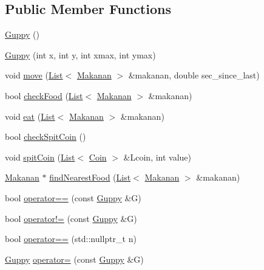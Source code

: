 \subsection*{Public Member Functions}
\begin{DoxyCompactItemize}
\item 
\mbox{\hyperlink{class_guppy_aa78f8b5323b1015c968a8edab52773f5}{Guppy}} ()
\item 
\mbox{\hyperlink{class_guppy_a887d984014e34e1ea918b39c5698ee42}{Guppy}} (int x, int y, int xmax, int ymax)
\item 
void \mbox{\hyperlink{class_guppy_ac6ca65d23a87ab54f0b82f5c45082776}{move}} (\mbox{\hyperlink{class_list}{List}}$<$ \mbox{\hyperlink{class_makanan}{Makanan}} $>$ \&makanan, double sec\+\_\+since\+\_\+last)
\item 
bool \mbox{\hyperlink{class_guppy_a34ca887a2c2ff3b3fba494d0abd31bda}{check\+Food}} (\mbox{\hyperlink{class_list}{List}}$<$ \mbox{\hyperlink{class_makanan}{Makanan}} $>$ \&makanan)
\item 
void \mbox{\hyperlink{class_guppy_a03f670d2a9f6a6a28d3028d806fda979}{eat}} (\mbox{\hyperlink{class_list}{List}}$<$ \mbox{\hyperlink{class_makanan}{Makanan}} $>$ \&makanan)
\item 
bool \mbox{\hyperlink{class_guppy_abab3975de3a054b14aa3b8e664e30b5b}{check\+Spit\+Coin}} ()
\item 
void \mbox{\hyperlink{class_guppy_a39dfc2b44aed14f056bddcc08ff7c598}{spit\+Coin}} (\mbox{\hyperlink{class_list}{List}}$<$ \mbox{\hyperlink{class_coin}{Coin}} $>$ \&Lcoin, int value)
\item 
\mbox{\hyperlink{class_makanan}{Makanan}} $\ast$ \mbox{\hyperlink{class_guppy_accaa1f62989d00f7859f56848009089a}{find\+Nearest\+Food}} (\mbox{\hyperlink{class_list}{List}}$<$ \mbox{\hyperlink{class_makanan}{Makanan}} $>$ \&makanan)
\item 
bool \mbox{\hyperlink{class_guppy_a02efb73289d3b94264fba7d6c1d985b8}{operator==}} (const \mbox{\hyperlink{class_guppy}{Guppy}} \&G)
\item 
bool \mbox{\hyperlink{class_guppy_aa872357ac2df872e8b748066d6b79556}{operator!=}} (const \mbox{\hyperlink{class_guppy}{Guppy}} \&G)
\item 
bool \mbox{\hyperlink{class_guppy_a8b7c06fba5a291556cd4bf5255ac153e}{operator==}} (std\+::nullptr\+\_\+t n)
\item 
\mbox{\hyperlink{class_guppy}{Guppy}} \mbox{\hyperlink{class_guppy_aa30f6db726124f670123daadb53a581f}{operator=}} (const \mbox{\hyperlink{class_guppy}{Guppy}} \&G)
\end{DoxyCompactItemize}

